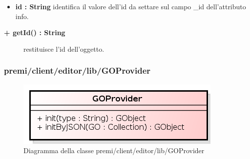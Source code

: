 \begin{description}
\begin{description}
\begin{description}
\begin{itemize}
					\item \textbf{id : String			} \hfill
					identifica il valore dell'id da settare sul campo \_id dell'attributo info.
				\end{itemize}
		\end{description}
		
\end{description}

\begin{description}
		\item[\textbf{\color{blue}+ getId() : String			}] \hfill
			restituisce l'id dell'oggetto.
\end{description}


\end{description}

\subsubsection{premi/client/editor/lib/GOProvider}
\begin{figure}[H]
\begin{center}
\includegraphics[scale=0.90]{img/diacla/GOProvider.png}
\caption{Diagramma della classe premi/client/editor/lib/GOProvider}
\end{center}
\end{figure}

